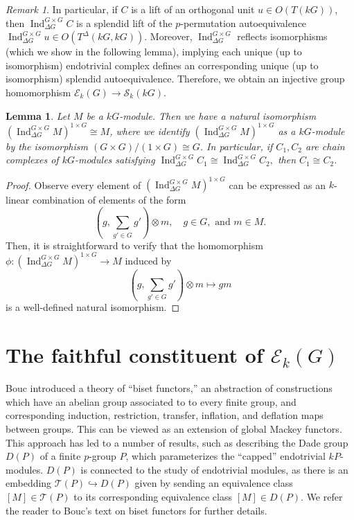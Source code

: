 \documentclass[10pt,letterpaper, boxed, cm]{amsart}
\newcommand{\Ind}{\operatorname{Ind}}
\newcommand{\calE}{\mathcal{E}}
\newcommand{\calS}{\mathcal{S}}
\newcommand{\calT}{\mathcal{T}}
\newtheorem{lemma}[theorem]{Lemma}
\theoremstyle{remark}
\newtheorem{remark}[theorem]{Remark}
\theoremstyle{definition}
\begin{document}
     \begin{remark}
         In particular, if $C$ is a lift of an orthogonal unit $u \in O(T(kG))$, then $\Ind^{G\times G}_{\Delta G} C$ is a splendid lift of the $p$-permutation autoequivalence $\Ind^{G\times G}_{\Delta G} u \in O(T^\Delta(kG, kG))$. Moreover, $\Ind^{G\times G}_{\Delta G}$ reflects isomorphisms (which we show in the following lemma), implying each unique (up to isomorphism) endotrivial complex defines an corresponding unique (up to isomorphism) splendid autoequivalence. Therefore, we obtain an injective group homomorphism $\calE_k(G) \to \calS_k(kG)$.
     \end{remark}

    \begin{lemma}
    	Let $M$ be a $kG$-module. Then we have a natural isomorphism $(\Ind^{G\times G}_{\Delta G} M)^{1\times G} \cong M$, where we identify $(\Ind^{G\times G}_{\Delta G} M)^{1\times G}$ as a $kG$-module by the isomorphism $(G\times G)/(1\times G)\cong G$. In particular, if $C_1,C_2$ are chain complexes of $kG$-modules satisfying $\Ind^{G\times G}_{\Delta G}C_1 \cong \Ind^{G\times G}_{\Delta G} C_2,$ then $C_1\cong C_2$.
    \end{lemma}
    \begin{proof}
    	Observe every element of $(\Ind^{G\times G}_{\Delta G} M)^{1\times G}$ can be expressed as an $k$-linear combination of elements of the form \[\left(g, \sum_{g' \in G}g'\right) \otimes m, \quad g\in G,\text{ and } m \in M.\] Then, it is straightforward to verify that the homomorphism $\phi: (\Ind^{G\times G}_{\Delta G} M)^{1\times G} \to M$ induced by \[\left(g, \sum_{g' \in G}g'\right) \otimes m \mapsto gm\] is a well-defined natural isomorphism.
    \end{proof}


	\section{The faithful constituent of $\calE_k(G)$} \label{faithfulsection}

	Bouc introduced a theory of ``biset functors,'' an abstraction of constructions which have an abelian group associated to to every finite group, and corresponding induction, restriction, transfer, inflation, and deflation maps between groups. This can be viewed as an extension of global Mackey functors. This approach has led to a number of results, such as describing the Dade group $D(P)$ of a finite $p$-group $P$, which parameterizes the ``capped'' endotrivial $kP$-modules. $D(P)$ is connected to the study of endotrivial modules, as there is an embedding $\calT(P) \hookrightarrow D(P)$ given by sending an equivalence class $[M] \in \calT(P)$ to its corresponding equivalence class $[M] \in D(P)$. We refer the reader to Bouc's text on biset functors \cite[Chapter 12]{Bou10} for further details.
\end{document}

